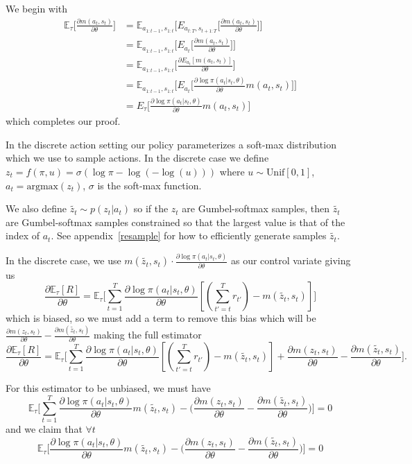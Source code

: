 \documentclass{article}
\newcommand{\E}{\mathbb{E}}
\newcommand{\LL}[1]{\frac{\partial \log \pi(a_{#1}| s_{#1}, \theta)}{\partial \theta}}
\begin{document}
We begin with 
\begin{align}
\E_\tau\Big[\frac{\partial m(a_t, s_t)}{\partial\theta}\Big] &= \E_{a_{1:t-1},s_{1:t}}\Big[E_{a_{t:T},s_{t+1:T}}\Big[\frac{\partial m(a_t, s_t)}{\partial\theta}\Big]\Big]\\
&= \E_{a_{1:t-1},s_{1:t}}\Big[E_{a_t}\Big[\frac{\partial m(a_t, s_t)}{\partial\theta}\Big]\Big]\\
&=  \E_{a_{1:t-1},s_{1:t}}\Big[\frac{\partial{E_{a_t}[m(a_t, s_t)]}}{\partial \theta}\Big]\\
&= \E_{a_{1:t-1},s_{1:t}}\Big[E_{a_t}\Big[\LL{t} m(a_t, s_t)\Big]\Big]\\
&= E_\tau\Big[\LL{t} m(a_t, s_t)\Big]
\end{align}
which completes our proof.

In the discrete action setting our policy parameterizes a soft-max distribution which we use to sample actions. 
In the discrete case we define $z_t = f(\pi, u) = \sigma (\log\pi - \log(-\log(u)))$ where $u\sim \text{Unif}[0, 1]$, $a_t = \text{argmax}(z_t)$, $\sigma$ is the soft-max function.

We also define $\tilde{z_t} \sim p(z_t|a_t)$ so if the $z_t$ are Gumbel-softmax samples, then $\tilde{z_t}$ are Gumbel-softmax samples constrained so that the largest value is that of the index of $a_t$.
See appendix~\ref{resample} for how to efficiently generate samples $\tilde{z_t}$. 

In the discrete case, we use $m(\tilde{z_t}, s_t)\cdot \LL{t}$ as our control variate giving us $$\frac{\partial \E_\tau[R]}{\partial \theta} = \E_\tau\Big[\sum_{t=1}^T \LL{t} [(\sum_{t'=t}^T r_{t'}) - m(\tilde{z_t}, s_t)]\Big]$$ which is biased, so we must add a term to remove this bias which will be $\frac{\partial m(z_t, s_t)}{\partial\theta} - \frac{\partial m(\tilde{z_t}, s_t)}{\partial\theta}$ making the full estimator
$$\frac{\partial \E_\tau[R]}{\partial \theta} = \E_\tau\Big[\sum_{t=1}^T \LL{t} [(\sum_{t'=t}^T r_{t'}) - m(\tilde{z_t}, s_t)] + \frac{\partial m(z_t, s_t)}{\partial\theta} -  \frac{\partial m(\tilde{z_t}, s_t)}{\partial\theta}\Big].$$ 

For this estimator to be unbiased, we must have $$\E_\tau\Big[\sum_{t=1}^T \LL{t} m(\tilde{z_t}, s_t) - \Big(\frac{\partial m(z_t, s_t)}{\partial\theta} - \frac{\partial m(\tilde{z_t}, s_t)}{\partial\theta}\Big)\Big] = 0$$ and we claim that $\forall t$  $$\E_\tau\Big[ \LL{t} m(\tilde{z_t}, s_t) - \Big(\frac{\partial m(z_t, s_t)}{\partial\theta} - \frac{\partial m(\tilde{z_t}, s_t)}{\partial\theta}\Big)\Big] = 0$$ 
\end{document}
